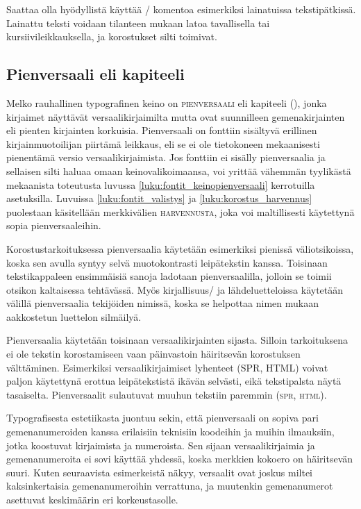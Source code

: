 Saattaa olla hyödyllistä käyttää \-/ komentoa esimerkiksi
lainatuissa tekstipätkissä. Lainattu teksti voidaan tilanteen mukaan
latoa tavallisella tai kursiivileikkauksella, ja korostukset silti
toimivat.

\subsection{Pienversaali eli kapiteeli}
\label{luku:korostus_pienversaali}

Melko rauhallinen typografinen keino on \textsc{pienversaali} eli
kapiteeli (), jonka kirjaimet näyttävät
versaalikirjaimilta mutta ovat suunnilleen gemenakirjainten eli pienten
kirjainten korkuisia. Pienversaali on fonttiin sisältyvä erillinen
kirjainmuotoilijan piirtämä leikkaus, eli se ei ole tietokoneen
mekaanisesti pienentämä versio versaalikirjaimista. Jos fonttiin ei
sisälly pienversaalia ja sellaisen silti haluaa omaan
keinovalikoimaansa, voi yrittää vähemmän tyylikästä mekaanista
toteutusta luvussa \ref{luku:fontit_keinopienversaali} kerrotuilla
asetuksilla. Luvuissa \ref{luku:fontit_valistys} ja
\ref{luku:korostus_harvennus} puolestaan käsitellään merkkivälien
{\scshape{} harvennusta}, joka voi
maltillisesti käytettynä sopia pienversaaleihin.

Korostustarkoituksessa pienversaalia käytetään esimerkiksi pienissä
väliotsikoissa, koska sen avulla syntyy selvä muotokontrasti
leipätekstin kanssa. Toisinaan tekstikappaleen ensimmäisiä sanoja
ladotaan pienversaalilla, jolloin se toimii otsikon kaltaisessa
tehtävässä. Myös kirjallisuus\-/{} ja lähdeluetteloissa käytetään
välillä pienversaalia tekijöiden nimissä, koska se helpottaa nimen
mukaan aakkostetun luettelon silmäilyä.

Pienversaalia käytetään toisinaan versaalikirjainten sijasta. Silloin
tarkoituksena ei ole tekstin korostamiseen vaan päinvastoin häiritsevän
korostuksen välttäminen. Esimerkiksi versaalikirjaimiset lyhenteet (SPR,
HTML) voivat paljon käytettynä erottua leipätekstistä ikävän selvästi,
eikä tekstipalsta näytä tasaiselta. Pienversaalit sulautuvat muuhun
tekstiin paremmin (\textsc{spr}, \textsc{html}).

Typografisesta estetiikasta juontuu sekin, että pienversaali on sopiva
pari gemenanumeroiden kanssa erilaisiin teknisiin koodeihin ja muihin
ilmauksiin, jotka koostuvat kirjaimista ja numeroista. Sen sijaan
versaalikirjaimia ja gemenanumeroita ei sovi käyttää yhdessä, koska
merkkien kokoero on häiritsevän suuri. Kuten seuraavista esimerkeistä
näkyy, versaalit ovat joskus miltei kaksinkertaisia gemenanumeroihin
verrattuna, ja muutenkin gemenanumerot asettuvat keskimäärin eri
korkeustasolle.


